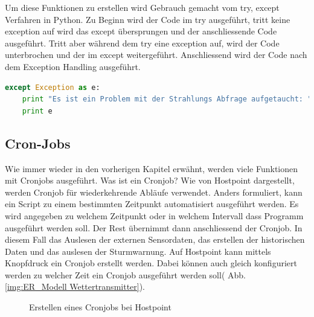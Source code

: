 Um diese Funktionen zu erstellen wird Gebrauch gemacht vom try, except Verfahren in Python. Zu Beginn wird der Code im try ausgeführt, tritt keine exception auf wird das except übersprungen und der anschliessende Code ausgeführt. Tritt aber während dem try eine exception auf, wird der Code unterbrochen und der im except weitergeführt. Anschliessend wird der Code nach dem Exception Handling ausgeführt.\cite{ThePythonTutorial8.ErrorsAndExceptions:Python}

\begin{lstlisting}[label=lst:printfunction,caption=Beispiel für print Funktion, language=Python, style=py]
except Exception as e:
    print "Es ist ein Problem mit der Strahlungs Abfrage aufgetaucht: "
    print e
\end{lstlisting}

\subsection{Cron-Jobs}
Wie immer wieder in den vorherigen Kapitel erwähnt, werden viele Funktionen mit Cronjobs ausgeführt. Was ist ein Cronjob? Wie von Hostpoint \cite{Hostpoint:CronjobsEinrichten} dargestellt, werden Cronjob für wiederkehrende Abläufe verwendet. Anders formuliert, kann ein Script zu einem bestimmten Zeitpunkt automatisiert ausgeführt werden. Es wird angegeben zu welchem Zeitpunkt oder in welchem Intervall dass Programm ausgeführt werden soll. Der Rest übernimmt dann anschliessend der Cronjob. In diesem Fall das Auslesen der externen Sensordaten, das erstellen der historischen Daten und das auslesen der Sturmwarnung. Auf Hostpoint kann mittels Knopfdruck ein Cronjob erstellt werden. Dabei können auch gleich konfiguriert werden zu welcher Zeit ein Cronjob ausgeführt werden soll( Abb. \ref{img:ER_Modell Wettertransmitter}).

\begin{figure}[h!]
	\centering
	\caption{Erstellen eines Cronjobs bei Hostpoint}
	\label{img:Cronjob}
\end{figure}

